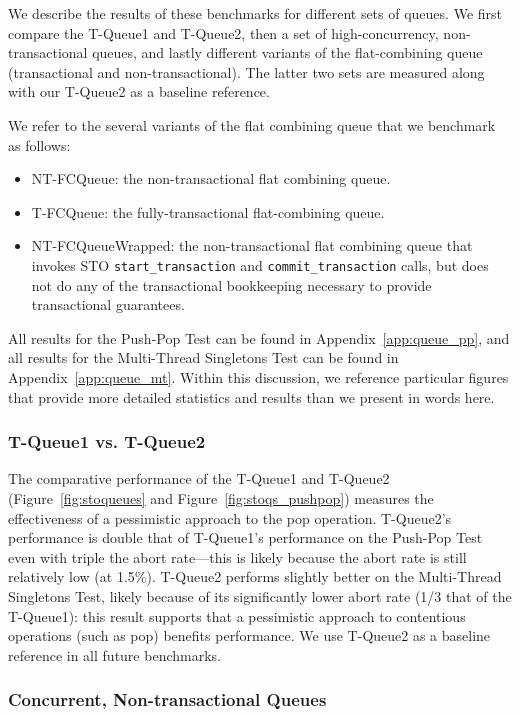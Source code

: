 We describe the results of these benchmarks for different sets of queues. We first compare the T-Queue1 and T-Queue2, then a set of high-concurrency, non-transactional queues, and lastly different variants of the flat-combining queue (transactional and non-transactional). The latter two sets are measured along with our T-Queue2 as a baseline reference.

We refer to the several variants of the flat combining queue that we benchmark as follows:
\begin{itemize}
    \item NT-FCQueue: the non-transactional flat combining queue.
    \item T-FCQueue: the fully-transactional flat-combining queue.
    \item NT-FCQueueWrapped: the non-transactional flat combining queue that invokes STO \texttt{start\_transaction} and \texttt{commit\_transaction} calls, but does not do any of the transactional bookkeeping necessary to provide transactional guarantees.
\end{itemize}

All results for the Push-Pop Test can be found in Appendix~\ref{app:queue_pp}, and all results for the Multi-Thread Singletons Test can be found in Appendix~\ref{app:queue_mt}. Within this discussion, we reference particular figures that provide more detailed statistics and results than we present in words here. 

\subsubsection{T-Queue1 vs. T-Queue2}

The comparative performance of the T-Queue1 and T-Queue2 (Figure~\ref{fig:stoqueues} and Figure~\ref{fig:stoqs_pushpop}) measures the effectiveness of a pessimistic approach to the pop operation. T-Queue2's performance is double that of T-Queue1's performance on the Push-Pop Test even with triple the abort rate---this is likely because the abort rate is still relatively low (at 1.5\%). T-Queue2 performs slightly better on the Multi-Thread Singletons Test, likely because of its significantly lower abort rate (1/3 that of the T-Queue1): this result supports that a pessimistic approach to contentious operations (such as pop) benefits performance.
We use T-Queue2 as a baseline reference in all future benchmarks. 

\subsubsection{Concurrent, Non-transactional Queues}

